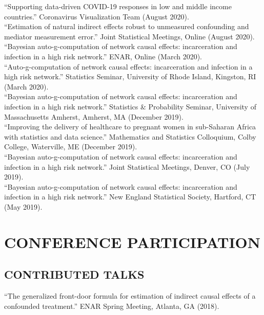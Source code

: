 \documentclass[12pt]{article}
\begin{document}
``Supporting data-driven COVID-19 responses in low and middle income countries.'' Coronavirus Visualization Team (August 2020). \\

``Estimation of natural indirect effects robust to unmeasured confounding and mediator measurement error.'' Joint Statistical Meetings, Online (August 2020). \\

``Bayesian auto-g-computation of network causal effects: incarceration and infection in a high risk network.'' ENAR, Online (March 2020). \\

``Auto-g-computation of network causal effects: incarceration and infection in a high risk network.'' Statistics Seminar, University of Rhode Island, Kingston, RI (March 2020). \\

``Bayesian auto-g-computation of network causal effects: incarceration and infection in a high risk network.'' Statistics \& Probability Seminar, University of Massachusetts Amherst, Amherst, MA (December 2019). \\

``Improving the delivery of healthcare to pregnant women in sub-Saharan Africa with statistics and data science.'' Mathematics and Statistics Colloquium, Colby College, Waterville, ME (December 2019). \\ 

``Bayesian auto-g-computation of network causal effects: incarceration and infection in a high risk network.'' Joint Statistical Meetings, Denver, CO (July 2019). \\

``Bayesian auto-g-computation of network causal effects: incarceration and infection in a high risk network.'' New England Statistical Society, Hartford, CT (May 2019). 

\section*{\textbf{{\large C}{ONFERENCE} {\large P}{ARTICIPATION}}}  

\subsection*{\textbf{CONTRIBUTED TALKS}}


``The generalized front-door formula for estimation of indirect causal effects of a confounded treatment.'' ENAR Spring Meeting, Atlanta, GA (2018). \\
\end{document}
